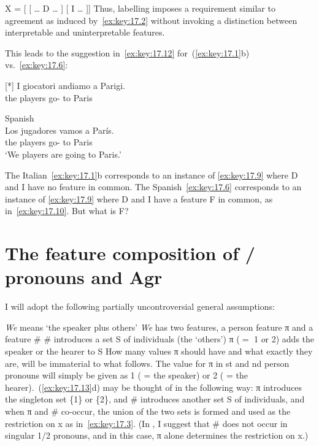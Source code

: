 \documentclass[output=paper]{langsci/langscibook}
\begin{document}
\ea\label{ex:key:17.11}
    X = [ [ \dots{} D \dots{} ] [ I \dots{} ]]
\z
Thus, labelling imposes a requirement similar to agreement as induced
by~\eqref{ex:key:17.2} without invoking a distinction between interpretable and
uninterpretable features.

This leads to the suggestion in~\eqref{ex:key:17.12} for~(\ref{ex:key:17.1}b) vs.\
\eqref{ex:key:17.6}:

\begin{exe}
    \exi{\eqref{ex:key:17.1}} 
    \begin{xlist}
    [*]{%
    \gll I giocatori andiamo a Parigi.\\
    the players go-\Fpl{} to Paris\\
    \glt}
    \end{xlist}
\end{exe}
\begin{exe}
\exi{\eqref{ex:key:17.6}} Spanish\\
    \gll    Los jugadores vamos a París.\\
            the players      go-\Fpl{} to Paris\\
    \glt    ‘We players are going to Paris.’\\
\end{exe}

\ea\label{ex:key:17.12}
    \ea The Italian~\eqref{ex:key:17.1}b corresponds to an instance of
    \eqref{ex:key:17.9} where D and I have no feature in common.
    \ex The Spanish~\eqref{ex:key:17.6} corresponds to an instance of
    \eqref{ex:key:17.9} where D and I have a feature F in common, as
    in~\eqref{ex:key:17.10}.
    \z
\z
But what is F?

\section{The feature composition of \First/\Spl{} pronouns and
Agr}\label{sec:key:17.3}

I will adopt the following partially uncontroversial general assumptions:

\ea\label{ex:key:17.13}
    \ea \emph{We} means ‘the speaker plus others’
    \ex \emph{We} has two features, a person feature π and a feature \#
    \ex \# introduces a set S of individuals (the ‘others’)
    \ex π ($=$ 1 $o$r 2) adds the speaker or the hearer to S
    \z
\z
How many values π should have and what exactly they are, will be immaterial
to what follows. The value for π in \First{}st and \Second{}nd person
pronouns will simply be given as 1 ( = the speaker) or 2 ( = the
hearer).~(\ref{ex:key:17.13}d) may be thought of in the following way: π
introduces the singleton set \{1\} or \{2\}, and \# introduces another set S of
individuals, and when π and \# co-occur, the union of the two sets is
formed and used as the restriction on x as in~\eqref{ex:key:17.3}. (In , I
suggest that \# does not occur in singular 1/2 pronouns, and in this case,
π alone determines the restriction on x.)
\end{document}
